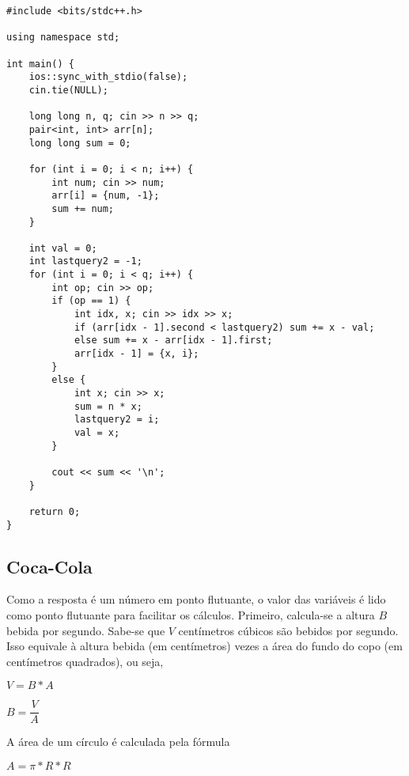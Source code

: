 \documentclass[11pt,fancychapters]{article}
\begin{document}
\begin{lstlisting}[style=c++]
#include <bits/stdc++.h>

using namespace std;

int main() {
    ios::sync_with_stdio(false);
    cin.tie(NULL);
    
    long long n, q; cin >> n >> q;
    pair<int, int> arr[n];
    long long sum = 0;
    
    for (int i = 0; i < n; i++) {
        int num; cin >> num;
        arr[i] = {num, -1};
        sum += num;
    }
    
    int val = 0;
    int lastquery2 = -1;
    for (int i = 0; i < q; i++) {
        int op; cin >> op;
        if (op == 1) {
            int idx, x; cin >> idx >> x;
            if (arr[idx - 1].second < lastquery2) sum += x - val;
            else sum += x - arr[idx - 1].first;
            arr[idx - 1] = {x, i};
        }
        else {
            int x; cin >> x;
            sum = n * x;
            lastquery2 = i;
            val = x;
        }
        
        cout << sum << '\n';
    }

    return 0;
}
\end{lstlisting}
\newpage
\begin{center}\section{Coca-Cola}\end{center}
\noindent
Como a resposta é um número em ponto flutuante, o valor das variáveis é lido como ponto flutuante para facilitar os cálculos. Primeiro, calcula-se a altura $B$ bebida por segundo. Sabe-se que $V$ centímetros cúbicos são bebidos por segundo. Isso equivale à altura bebida (em centímetros) vezes a área do fundo do copo (em centímetros quadrados), ou seja,
\newline
\begin{center}
\begin{math}
    V = B * A
\end{math}
\end{center}
\begin{center}
\begin{math}
    B = \dfrac{V}{A}
\end{math}
\end{center}
A área de um círculo é calculada pela fórmula
\begin{center}
\begin{math}
    A = \pi * R * R
\end{math}
\end{center}
\end{document}

